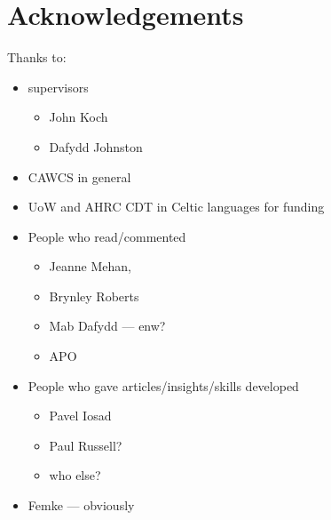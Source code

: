 \chapter*{Acknowledgements}%
\label{cha:ack}

Thanks to:
\begin{itemize}
\item supervisors
  \begin{itemize}
\item John Koch
\item Dafydd Johnston
\end{itemize}
\item CAWCS in general
\item UoW and AHRC CDT in Celtic languages for funding
\item People who read/commented
  \begin{itemize}
  \item Jeanne Mehan,
  \item Brynley Roberts
  \item Mab Dafydd --- enw?
  \item APO
  \end{itemize}
\item People who gave articles/insights/skills developed
  \begin{itemize}
  \item Pavel Iosad
  \item Paul Russell?
  \item who else?
  \end{itemize}
\item Femke --- obviously
  
\end{itemize}
